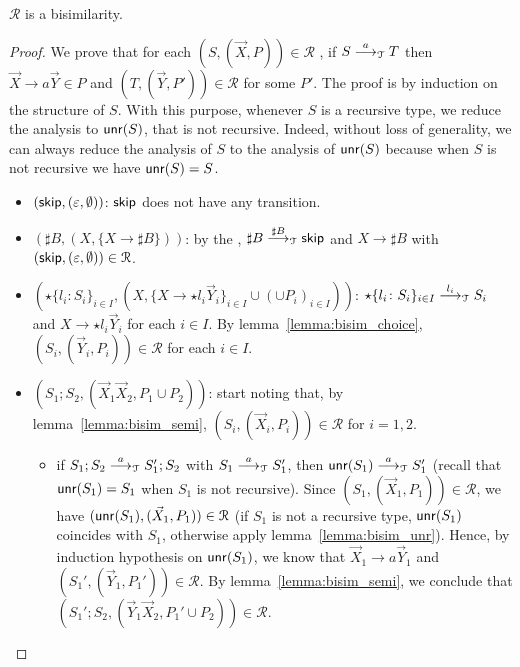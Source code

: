 \begin{theorem}
\label{thm:cfst_vs_grammar}
	$\mathcal{R}$ is a bisimilarity.
\end{theorem}

\begin{proof}
	We prove that for each $(S, (\vec X, P))\in \mathcal{R}$	, if
	$S \LTSderives[a] T$ then $\vec X \rightarrow a \vec Y\in P$
	and $(T, (\vec Y, P'))\in \mathcal{R}$ for some $P'$. The proof is by
	induction on the structure of $S$. With this purpose, whenever $S$ is a 
	recursive type, we reduce the analysis to $\Unravel(S)$, that
	is not recursive. Indeed, without loss of generality, 
	we can always reduce the analysis of $S$
	to the analysis of $\Unravel(S)$
	because when $S$ is not recursive we have
	$\Unravel(S)=S$.
	\begin{itemize}
		\item $(\skipk, (\varepsilon, \emptyset))$: $\skipk$ does not have any
		transition.
		\item $(\sharp B,(X,\{X \rightarrow \sharp B\}))$: by the \LTS,
		$\sharp B\LTSderives[\sharp B] \skipk$ and $X\rightarrow \sharp B$ with
		$(\skipk, (\varepsilon, \emptyset))\in \mathcal{R}$.
		\item $(\star\{l_i\colon S_i\}_{i\in I}, (X, \{X \rightarrow \star l_i
    	\vec Y_i\}_{i\in I} \cup (\cup  P_i)_{i\in I}))$: 
    	$\star\{l_i\colon S_i\}_{i\in I}\LTSderives[l_i] S_i$ and 
    	$X \rightarrow \star l_i \vec Y_i$ for each $i\in I$. By 
    	lemma~\ref{lemma:bisim_choice}, $(S_i, (\vec Y_i,  P_i))\in\mathcal{R}$
    	for each $i\in I$. 
    	\item $(S_1;S_2, (\vec X_1\vec X_2,  P_1 \cup  P_2))$: start noting
    	that, by lemma~\ref{lemma:bisim_semi}, 
    	$(S_i, (\vec X_i, P_i))\in \mathcal{R}$ for $i=1,2$. 
    	\begin{itemize}
    	\item if 
    	$S_1;S_2\LTSderives[a] S_1'; S_2$ with $S_1\LTSderives[a] S_1'$, then 
    	$\Unravel(S_1)\LTSderives[a] S_1'$ (recall that $\Unravel(S_1)=S_1$ when
    	$S_1$ is not recursive). 
    	Since $(S_1,(\vec X_1, P_1))\in\mathcal{R}$, we have
    	$(\Unravel(S_1), (\vec X_1, P_1))\in \mathcal{R}$ 
    	(if $S_1$ is not a recursive type, $\Unravel(S_1)$ 
    	coincides with $S_1$, otherwise apply lemma~\ref{lemma:bisim_unr}).
    	Hence, by induction hypothesis on $\Unravel(S_1)$, we know that 
    	$\vec X_1 \rightarrow a \vec Y_1$ and 
    	$(S_1', (\vec Y_1,P_1'))\in \mathcal{R}$. 
    	By lemma~\ref{lemma:bisim_semi}, we conclude that 
    	$(S_1';S_2, (\vec Y_1 \vec X_2,P_1'\cup P_2))\in \mathcal{R}$. 

\end{itemize}
\end{itemize}
\end{proof}
